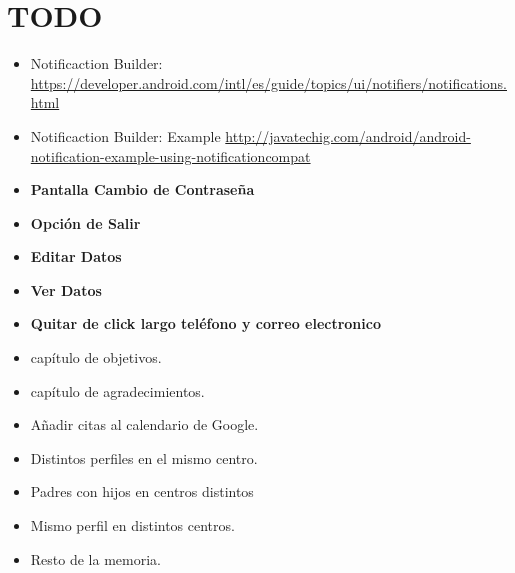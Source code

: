 %
%
%
%

\cleardoublepage
\chapter{TODO}
\label{chap:TODO}

\begin{itemize}
	\item Notificaction Builder: \url{https://developer.android.com/intl/es/guide/topics/ui/notifiers/notifications.html}
	\item Notificaction Builder: Example \url{http://javatechig.com/android/android-notification-example-using-notificationcompat}
	\item {\bf Pantalla Cambio de Contraseña}
	\item {\bf Opción de Salir}
	\item {\bf Editar Datos}
	\item {\bf Ver Datos}
	\item {\bf Quitar de click largo teléfono y correo electronico}
	\item capítulo de objetivos.
	\item capítulo de agradecimientos.
	\item Añadir citas al calendario de Google.
	\item Distintos perfiles en el mismo centro.
	\item Padres con hijos en centros distintos
	\item Mismo perfil en distintos centros.
	\item Resto de la memoria.
\end{itemize}